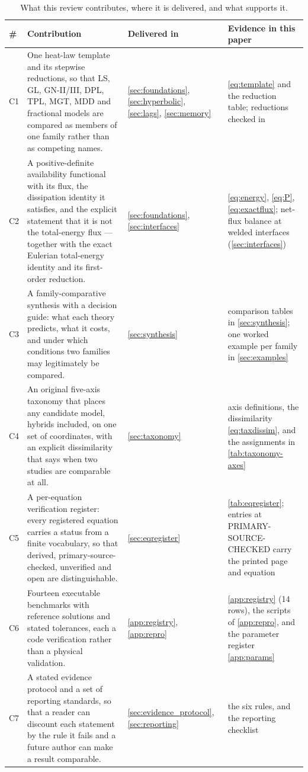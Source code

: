 \begin{table}[H]\centering\small
\caption{What this review contributes, where it is delivered, and what supports it.}
\label{tab:contributions}
\begin{tabularx}{\textwidth}{@{}p{0.5cm}Y p{2.5cm}Y@{}}
\toprule
\textbf{\#} & \textbf{Contribution} & \textbf{Delivered in} & \textbf{Evidence in this paper} \\
\midrule
C1 & One heat-law template and its stepwise reductions, so that LS, GL, GN-II/III, DPL, TPL, MGT, MDD
  and fractional models are compared as members of one family rather than as competing names. &
  \cref{sec:foundations}, \cref{sec:hyperbolic}, \cref{sec:lags}, \cref{sec:memory} &
  \eqref{eq:template} and the reduction table; reductions checked in  \\
C2 & A positive-definite availability functional with its flux, the dissipation identity it satisfies,
  and the explicit statement that it is not the total-energy flux --- together with the exact Eulerian
  total-energy identity and its first-order reduction. & \cref{sec:foundations}, \cref{sec:interfaces} &
  \eqref{eq:energy}, \eqref{eq:P}, \eqref{eq:exactflux}; net-flux balance at welded interfaces (\cref{sec:interfaces}) \\
C3 & A family-comparative synthesis with a decision guide: what each theory predicts, what it costs, and
  under which conditions two families may legitimately be compared. & \cref{sec:synthesis} &
  comparison tables in \cref{sec:synthesis}; one worked example per family in \cref{sec:examples} \\
C4 & An original five-axis taxonomy that places any candidate model, hybrids included, on one set of
  coordinates, with an explicit dissimilarity that says when two studies are comparable at all. &
  \cref{sec:taxonomy} & axis definitions, the dissimilarity \eqref{eq:taxdissim}, and the assignments in
  \cref{tab:taxonomy-axes} \\
C5 & A per-equation verification register: every registered equation carries a status from a finite
  vocabulary, so that derived, primary-source-checked, unverified and open are distinguishable. &
  \cref{sec:eqregister} & \cref{tab:eqregister}; entries at PRIMARY-SOURCE-CHECKED carry the printed page and equation \\
C6 & Fourteen executable benchmarks with reference solutions and stated tolerances, each a code
  verification rather than a physical validation. & \cref{app:registry}, \cref{app:repro} &
  \cref{app:registry} (14 rows), the scripts of \cref{app:repro}, and the parameter register
  \cref{app:params} \\
C7 & A stated evidence protocol and a set of reporting standards, so that a reader can discount each
  statement by the rule it fails and a future author can make a result comparable. &
  \cref{sec:evidence_protocol}, \cref{sec:reporting} & the six rules, and the reporting checklist \\
\bottomrule
\end{tabularx}
\end{table}

